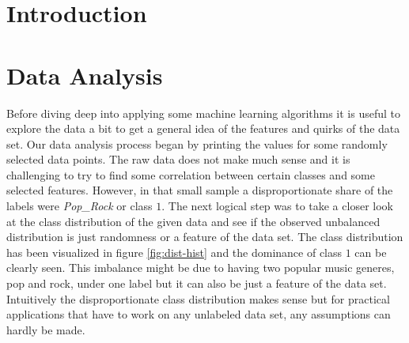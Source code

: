 \documentclass[fleqn,10pt]{SelfArx} %
\begin{document}
\boldmath

\flushbottom %

\maketitle %

\tableofcontents %

\thispagestyle{empty} %


\section{Introduction} %


\lipsum[1-3] %


\section{Data Analysis}

Before diving deep into applying some machine learning algorithms it is useful
to explore the data a bit to get a general idea of the features and quirks of
the data set. Our data analysis process began by printing the values for some randomly
selected data points. The raw data does not make much sense and it is
challenging to try to find some correlation between certain classes and some
selected features. However, in that small sample a disproportionate share of the
labels were \textit{Pop\_Rock} or class $1$. The next logical step was to take a
closer look at the class distribution of the given data and see if the observed
unbalanced distribution is just randomness or a feature of the data set. The
class distribution has been visualized in figure \ref{fig:dist-hist} and the
dominance of class $1$ can be clearly seen. This imbalance might be due to
having two popular music generes, pop and rock, under one label but it can also
be just a feature of the data set.
Intuitively the disproportionate class distribution makes sense but for
practical applications that have to work on any unlabeled data set, any
assumptions can hardly be made.
\end{document}
